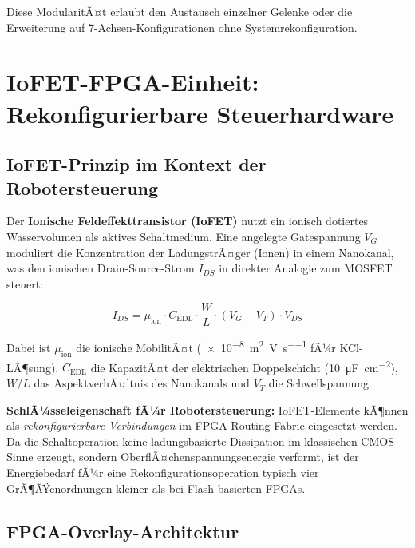 ﻿\documentclass[a4paper,12pt]{scrreprt}
\theoremstyle{definition}
\begin{document}
Diese ModularitÃ¤t erlaubt den Austausch einzelner Gelenke oder die
Erweiterung auf 7-Achsen-Konfigurationen ohne Systemrekonfiguration.

\section{IoFET-FPGA-Einheit: Rekonfigurierbare Steuerhardware}

\subsection{IoFET-Prinzip im Kontext der Robotersteuerung}

Der \textbf{Ionische Feldeffekttransistor (IoFET)} nutzt ein ionisch
dotiertes Wasservolumen als aktives Schaltmedium. Eine angelegte
Gatespannung $V_G$ moduliert die Konzentration der LadungstrÃ¤ger
(Ionen) in einem Nanokanal, was den ionischen Drain-Source-Strom $I_{DS}$
in direkter Analogie zum MOSFET steuert:

\begin{equation}
  I_{DS} = \mu_{\text{ion}} \cdot C_{\text{EDL}} \cdot
  \frac{W}{L} \cdot (V_G - V_T) \cdot V_{DS}
\end{equation}

Dabei ist $\mu_{\text{ion}}$ die ionische MobilitÃ¤t (\SI{e-8}{\meter\squared\per\volt\per\second}
fÃ¼r KCl-LÃ¶sung), $C_{\text{EDL}}$ die KapazitÃ¤t der elektrischen
Doppelschicht (\SI{10}{\micro\farad\per\centi\meter\squared}),
$W/L$ das AspektverhÃ¤ltnis des Nanokanals und $V_T$ die Schwellspannung.

\begin{infobox}
\textbf{SchlÃ¼sseleigenschaft fÃ¼r Robotersteuerung:}
IoFET-Elemente kÃ¶nnen als \emph{rekonfigurierbare Verbindungen}
im FPGA-Routing-Fabric eingesetzt werden. Da die Schaltoperation
keine ladungsbasierte Dissipation im klassischen CMOS-Sinne erzeugt,
sondern OberflÃ¤chenspannungsenergie verformt, ist der Energiebedarf
fÃ¼r eine Rekonfigurationsoperation typisch vier GrÃ¶ÃŸenordnungen
kleiner als bei Flash-basierten FPGAs.
\end{infobox}

\subsection{FPGA-Overlay-Architektur}
\end{document}
